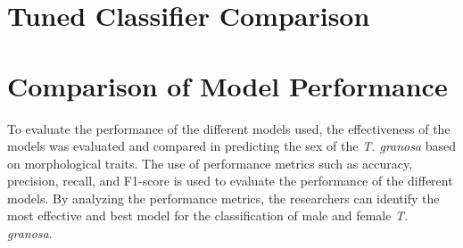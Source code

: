 \section{Tuned Classifier Comparison}

\begin{table}[H]
	\centering
	\caption{Tuned Classifier Comparison}
	\label{tab:tuned-classifier-comparison}
\end{table}



\section{Comparison of Model Performance}

To evaluate the performance of the different models used, the effectiveness of the models was evaluated and compared in predicting the sex of the \textit{T. granosa} based on morphological traits. The use of performance metrics such as accuracy, precision, recall, and F1-score is used to evaluate the performance of the different models. By analyzing the performance metrics, the researchers can identify the most effective and best model for the classification of male and female \textit{T. granosa}. 


\begin{table}[H]
	\centering
	\caption{Model Performance Comparison}
	\label{tab:model-performance}
\end{table}

